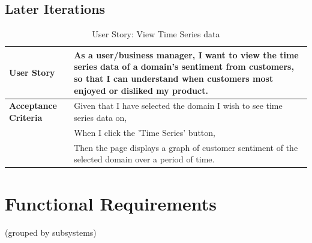 \documentclass[12pt]{article}
\begin{document}
\subsection{Later Iterations}
\begin{table}[htbp]
\caption{User Story: View Time Series data}
\begin{tabular}{|p{}|p{}|}
\hline
\textbf{User Story} & As a user/business manager, I want to view the time series data of a domain's sentiment from customers, so that I can understand when customers most enjoyed or disliked my product. \\
\hline
\textbf{Acceptance Criteria} & 
Given that I have selected the domain I wish to see time series data on,\\
& When I click the 'Time Series' button,\\
& Then the page displays a graph of customer sentiment of the selected domain over a period of time. \\
\hline
\end{tabular}
\end{table}

\newpage

\section{Functional Requirements}

(grouped by subsystems)
\end{document}
